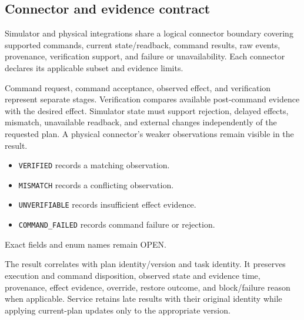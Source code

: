  

\subsection{Connector and evidence contract}

Simulator and physical integrations share a logical connector boundary covering supported commands, current state/readback, command results, raw events, provenance, verification support, and failure or unavailability. Each connector declares its applicable subset and evidence limits. 

 

Command request, command acceptance, observed effect, and verification represent separate stages. Verification compares available post-command evidence with the desired effect. Simulator state must support rejection, delayed effects, mismatch, unavailable readback, and external changes independently of the requested plan. A physical connector's weaker observations remain visible in the result. 

\begin{itemize}
\item \texttt{VERIFIED} records a matching observation.
\item \texttt{MISMATCH} records a conflicting observation.
\item \texttt{UNVERIFIABLE} records insufficient effect evidence.
\item \texttt{COMMAND\_FAILED} records command failure or rejection.
\end{itemize}
Exact fields and enum names remain OPEN. 

The result correlates with plan identity/version and task identity. It preserves execution and command disposition, observed state and evidence time, provenance, effect evidence, override, restore outcome, and block/failure reason when applicable. Service retains late results with their original identity while applying current-plan updates only to the appropriate version. 

